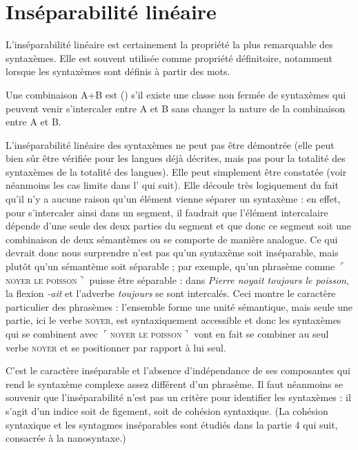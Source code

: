 \section{Inséparabilité linéaire}\label{sec:3.1.15}

L’inséparabilité linéaire est certainement la propriété la plus remarquable des syntaxèmes. Elle est souvent utilisée comme propriété définitoire, notamment lorsque les syntaxèmes sont définis à partir des mots.

{Une combinaison A+B est ()  s’il existe une classe non fermée de syntaxèmes qui peuvent venir s’intercaler entre A et B sans changer la nature de la combinaison entre A et B.}

L’inséparabilité linéaire des syntaxèmes ne peut pas être démontrée (elle peut bien sûr être vérifiée pour les langues déjà décrites, mais pas pour la totalité des syntaxèmes de la totalité des langues). Elle peut simplement être constatée (voir néanmoins les cas limite dans l’ qui suit). Elle découle très logiquement du fait qu’il n’y a aucune raison qu’un élément vienne séparer un syntaxème : en effet, pour s’intercaler ainsi dans un segment, il faudrait que l’élément intercalaire dépende d’une seule des deux parties du segment et que donc ce segment soit une combinaison de deux sémantèmes ou se comporte de manière analogue. Ce qui devrait donc nous surprendre n’est pas qu’un syntaxème soit inséparable, mais plutôt qu’un sémantème soit séparable ; par exemple, qu’un phrasème comme $⌜$\textsc{noyer} \textsc{le} \textsc{poisson}$⌝$ puisse être séparable : dans \textit{Pierre noyait toujours le poisson}, la flexion \textit{{}-ait} et l’adverbe \textit{toujours} se sont intercalés. Ceci montre le caractère particulier des phrasèmes : l’ensemble forme une unité sémantique, mais seule une partie, ici le verbe \textsc{noyer}, est syntaxiquement accessible et donc les syntaxèmes qui se combinent avec $⌜$\textsc{noyer} \textsc{le} \textsc{poisson}$⌝$ vont en fait se combiner au seul verbe \textsc{noyer} et se positionner par rapport à lui seul.

C’est le caractère inséparable et l’absence d’indépendance de ses composantes qui rend le syntaxème complexe assez différent d’un phrasème. Il faut néanmoins se souvenir que l’inséparabilité n’est pas un critère pour identifier les syntaxèmes : il s’agit d’un indice soit de figement, soit de cohésion syntaxique. (La cohésion syntaxique et les syntagmes inséparables sont étudiés dans la partie 4 qui suit, consacrée à la nanosyntaxe.)

